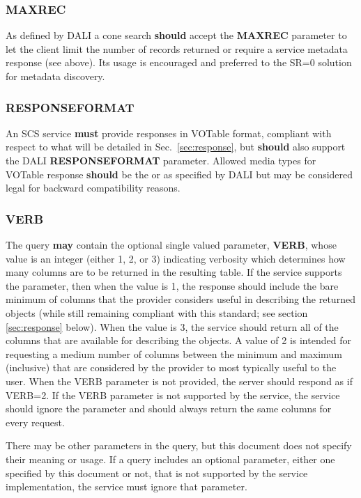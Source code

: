 \documentclass[11pt,a4paper]{ivoa}
\begin{document}
\subsubsection{MAXREC}
As defined by DALI a cone search \textbf{should} accept the \textbf{MAXREC} parameter to let the client limit the number of records returned or require a service metadata response (see above).  Its usage is encouraged and preferred to the SR=0 solution for metadata discovery.

\subsubsection{RESPONSEFORMAT}
\label{subsubsec:responseformat}
An SCS service \textbf{must} provide responses in VOTable \citep{std:VOTABLE} format, compliant with respect to what will be detailed in Sec.~\ref{sec:response}, but \textbf{should} also support the DALI \textbf{RESPONSEFORMAT} parameter. Allowed media types for VOTable response \textbf{should} be the  or  as specified by DALI but  may be considered legal for backward compatibility reasons.

\subsubsection{VERB}
The query \textbf{may} contain the optional single valued parameter, \textbf{VERB}, whose value is an integer (either 1, 2, or 3) indicating verbosity which determines how many columns are to be returned in the resulting table. If the service supports the parameter, then when the value is 1, the response should include the bare minimum of columns that the provider considers useful in describing the returned objects (while still remaining compliant with this standard; see section \ref{sec:response} below). When the value is 3, the service should return all of the columns that are available for describing the objects. A value of 2 is intended for requesting a medium number of columns between the minimum and maximum (inclusive) that are considered by the provider to most typically useful to the user. When the VERB parameter is not provided, the server should respond as if VERB=2. If the VERB parameter is not supported by the service, the service should ignore the parameter and should always return the same columns for every request.

There may be other parameters in the query, but this document does not specify their meaning or usage. If a query includes an optional parameter, either one specified by this document or not, that is not supported by the service implementation, the service must ignore that parameter.
\end{document}
